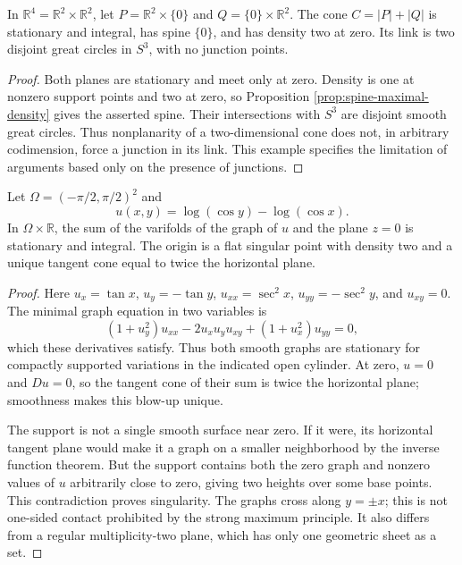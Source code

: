 \begin{example}\label{ex:disjoint-great-circle-link}
In $\mathbb R^4=\mathbb R^2\times\mathbb R^2$, let $P=\mathbb R^2\times\{0\}$ and $Q=\{0\}\times\mathbb R^2$. The cone $C=|P|+|Q|$ is stationary and integral, has spine $\{0\}$, and has density two at zero. Its link is two disjoint great circles in $S^3$, with no junction points.
\end{example}
\begin{proof}
Both planes are stationary and meet only at zero. Density is one at nonzero support points and two at zero, so Proposition \ref{prop:spine-maximal-density} gives the asserted spine. Their intersections with $S^3$ are disjoint smooth great circles. Thus nonplanarity of a two-dimensional cone does not, in arbitrary codimension, force a junction in its link. This example specifies the limitation of arguments based only on the presence of junctions.
\end{proof}

\begin{example}\label{ex:scherk-flat-singular}
Let $\Omega=(-\pi/2,\pi/2)^2$ and
\[
 u(x,y)=\log(\cos y)-\log(\cos x).
\]
In $\Omega\times\mathbb R$, the sum of the varifolds of the graph of $u$ and the plane $z=0$ is stationary and integral. The origin is a flat singular point with density two and a unique tangent cone equal to twice the horizontal plane.
\end{example}
\begin{proof}
Here $u_x=\tan x$, $u_y=-\tan y$, $u_{xx}=\sec^2x$, $u_{yy}=-\sec^2y$, and $u_{xy}=0$. The minimal graph equation in two variables is
\[
 (1+u_y^2)u_{xx}-2u_xu_yu_{xy}+(1+u_x^2)u_{yy}=0,
\]
which these derivatives satisfy. Thus both smooth graphs are stationary for compactly supported variations in the indicated open cylinder. At zero, $u=0$ and $Du=0$, so the tangent cone of their sum is twice the horizontal plane; smoothness makes this blow-up unique.

The support is not a single smooth surface near zero. If it were, its horizontal tangent plane would make it a graph on a smaller neighborhood by the inverse function theorem. But the support contains both the zero graph and nonzero values of $u$ arbitrarily close to zero, giving two heights over some base points. This contradiction proves singularity. The graphs cross along $y=\pm x$; this is not one-sided contact prohibited by the strong maximum principle. It also differs from a regular multiplicity-two plane, which has only one geometric sheet as a set.
\end{proof}
